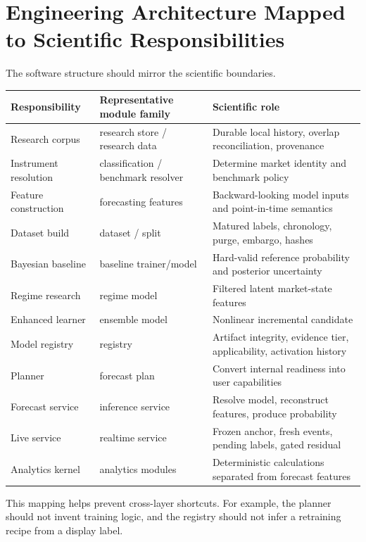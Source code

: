 \documentclass[11pt]{article}
\begin{document}
\section{Engineering Architecture Mapped to Scientific Responsibilities}
The software structure should mirror the scientific boundaries.
\begin{longtable}{p{}p{}p{}}
\toprule
Responsibility & Representative module family & Scientific role\\
\midrule
\endhead
Research corpus & research store / research data & Durable local history, overlap reconciliation, provenance\\
Instrument resolution & classification / benchmark resolver & Determine market identity and benchmark policy\\
Feature construction & forecasting features & Backward-looking model inputs and point-in-time semantics\\
Dataset build & dataset / split & Matured labels, chronology, purge, embargo, hashes\\
Bayesian baseline & baseline trainer/model & Hard-valid reference probability and posterior uncertainty\\
Regime research & regime model & Filtered latent market-state features\\
Enhanced learner & ensemble model & Nonlinear incremental candidate\\
Model registry & registry & Artifact integrity, evidence tier, applicability, activation history\\
Planner & forecast plan & Convert internal readiness into user capabilities\\
Forecast service & inference service & Resolve model, reconstruct features, produce probability\\
Live service & realtime service & Frozen anchor, fresh events, pending labels, gated residual\\
Analytics kernel & analytics modules & Deterministic calculations separated from forecast features\\
\bottomrule
\end{longtable}

This mapping helps prevent cross-layer shortcuts. For example, the planner should not invent training logic, and the registry should not infer a retraining recipe from a display label.
\end{document}
